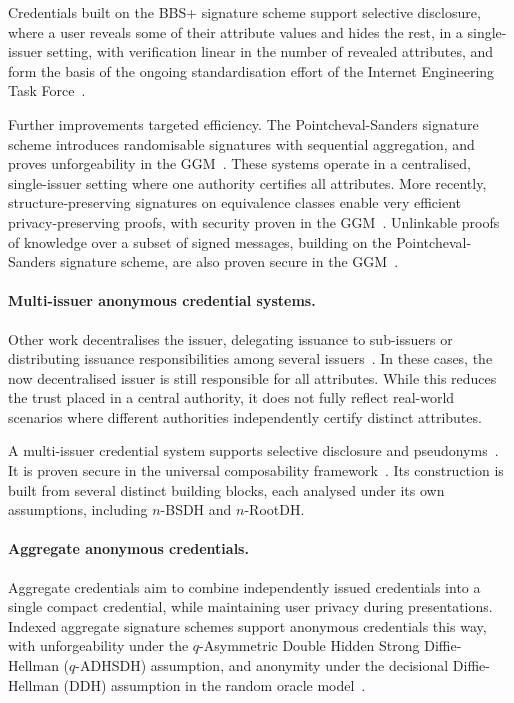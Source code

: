 Credentials built on the BBS+ signature scheme support selective disclosure,
where a user reveals some of their attribute values and hides the rest, in a
single-issuer setting, with verification linear in the number of revealed
attributes, and form the basis of the ongoing standardisation effort of the
Internet Engineering Task Force~\cite{EC:BonBoy04a,SCN:AuSusMu06}.

Further improvements targeted efficiency. The Pointcheval-Sanders signature
scheme introduces randomisable signatures with sequential aggregation, and
proves unforgeability in the GGM~\cite{RSA:PoiSan16}.
These systems operate in a centralised, single-issuer setting where one
authority certifies all attributes. More recently, structure-preserving
signatures on equivalence classes enable very efficient privacy-preserving
proofs, with security proven in the GGM~\cite{JC:FucHanSla19}. Unlinkable
proofs of knowledge over a subset of signed messages, building on the
Pointcheval-Sanders signature scheme, are also proven secure in the
GGM~\cite{PKC:Sanders20}.

\paragraph{Multi-issuer anonymous credential systems.} Other work decentralises
the issuer, delegating issuance to sub-issuers or distributing issuance
responsibilities among several
issuers~\cite{TCC:BCKL08,CCS:CamDriDub17,NDSS:SABMD19}. In these cases, the now
decentralised issuer is still responsible for all attributes. While this reduces
the trust placed in a central authority, it does not fully reflect real-world
scenarios where different authorities independently certify distinct attributes.

A multi-issuer credential system supports selective disclosure and
pseudonyms~\cite{AC:CDHK15}. It is proven secure in the universal composability
framework~\cite{FOCS:Canetti01}. Its construction is built from
several distinct building blocks, each analysed under its own assumptions,
including $n$-BSDH and $n$-RootDH.

\paragraph{Aggregate anonymous credentials.} Aggregate credentials aim to
combine independently issued credentials into a single compact credential, while
maintaining user privacy during presentations. Indexed aggregate signature
schemes support anonymous credentials this way, with unforgeability under the
$q$-Asymmetric Double Hidden Strong Diffie-Hellman ($q$-ADHSDH) assumption, and
anonymity under the decisional Diffie-Hellman (DDH) assumption in the random
oracle model~\cite{canard2011anonymous}.

